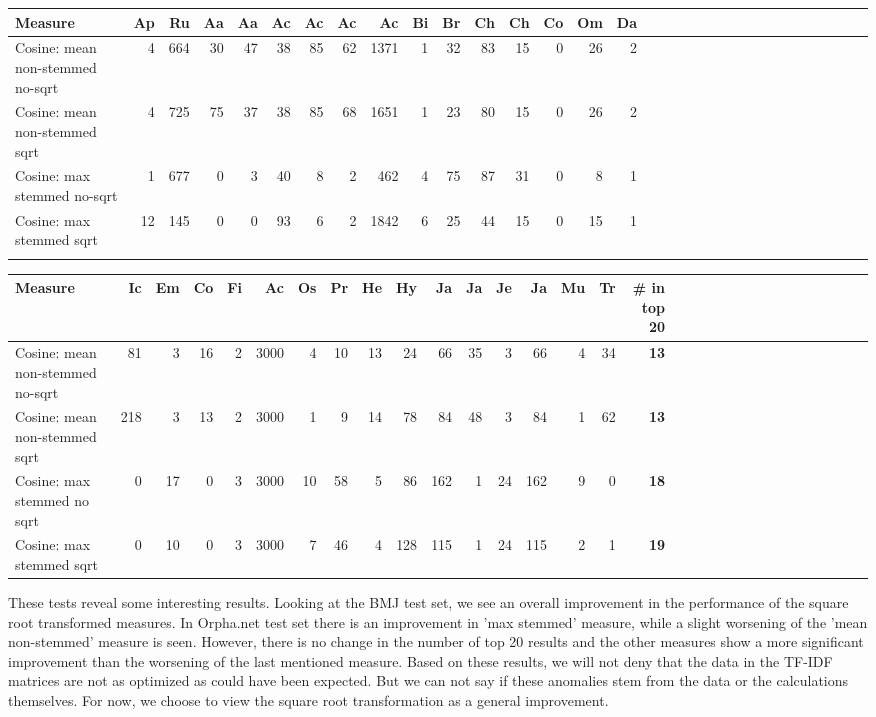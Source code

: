 \begin{table}[H]
\begin{tiny}
  \begin{tabular}{|l|r|r|r|r|r|r|r|r|r|r|r|r|r|r|r|r|r|r|r|r|r|r|r|r|r|r|r|r|r|r|r|}
    \hline
    Measure &Ap&Ru&Aa&Aa&Ac&Ac&Ac&Ac&Bi&Br&Ch&Ch&Co&Om&Da\\
    \hline
    Cosine: mean non-stemmed no-sqrt &4&664&30&47&38&85&62&1371&1&32&83&15&0&26&2\\
    \hline
    Cosine: mean non-stemmed sqrt &4&725&75&37&38&85&68&1651&1&23&80&15&0&26&2\\
    \hline
    Cosine: max stemmed no-sqrt &1&677&0&3&40&8&2&462&4&75&87&31&0&8&1\\
    \hline
    Cosine: max stemmed sqrt &12&145&0&0&93&6&2&1842&6&25&44&15&0&15&1 \\
    \hline
    \multicolumn{16}{c}{} \\
    \end{tabular}
    \begin{tabular}{|l|r|r|r|r|r|r|r|r|r|r|r|r|r|r|r|r|r|r|r|r|r|r|r|r|r|r|r|r|r|r|}
    \hline
     Measure &Ic&Em&Co&Fi&Ac&Os&Pr&He&Hy&Ja&Ja&Je&Ja&Mu&Tr &\scriptsize{\textbf{\# in top 20}} \\
    \hline
    Cosine: mean non-stemmed no-sqrt &81&3&16&2&3000&4&10&13&24&66&35&3&66&4&34 & \scriptsize{\textbf{13}} \\
    \hline
    Cosine: mean non-stemmed sqrt &218&3&13&2&3000&1&9&14&78&84&48&3&84&1&62 & \scriptsize{\textbf{13}} \\
    \hline
    Cosine: max stemmed no sqrt &0&17&0&3&3000&10&58&5&86&162&1&24&162&9&0 & \scriptsize{\textbf{18}} \\
    \hline
    Cosine: max stemmed sqrt &0&10&0&3&3000&7&46&4&128&115&1&24&115&2&1 & \scriptsize{\textbf{19}} \\
    \hline
  \end{tabular}
\end{tiny}
\end{table}

These tests reveal some interesting results. Looking at the BMJ test set, we see an overall 
improvement in the performance of the square root transformed measures. In Orpha.net test 
set there is an improvement in 'max stemmed' measure, while a slight worsening of the 'mean 
non-stemmed' measure is seen. However, there is no change in the number of top 20 results and the 
other measures show a more significant improvement than the worsening of the last mentioned 
measure. Based on these results, we will not deny that the data in the TF-IDF matrices are 
not as optimized as could have been expected. But we can not say if these anomalies stem from 
the data or the calculations themselves. For now, we choose to view the square root 
transformation as a general improvement.

